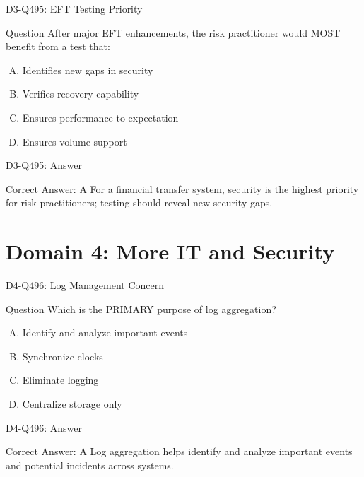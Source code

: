\documentclass{beamer}
\begin{document}
\begin{frame}{D3-Q495: EFT Testing Priority}
	\begin{block}{Question}
		After major EFT enhancements, the risk practitioner would MOST benefit from a test that:
	\end{block}
	\begin{enumerate}[(A)]
		\item Identifies new gaps in security
		\item Verifies recovery capability
		\item Ensures performance to expectation
		\item Ensures volume support
	\end{enumerate}
\end{frame}
\begin{frame}{D3-Q495: Answer}
	\begin{block}{Correct Answer: A}
		For a financial transfer system, security is the highest priority for risk practitioners; testing should reveal new security gaps.
	\end{block}
\end{frame}

\section{Domain 4: More IT and Security}

\begin{frame}{D4-Q496: Log Management Concern}
	\begin{block}{Question}
		Which is the PRIMARY purpose of log aggregation?
	\end{block}
	\begin{enumerate}[(A)]
		\item Identify and analyze important events
		\item Synchronize clocks
		\item Eliminate logging
		\item Centralize storage only
	\end{enumerate}
\end{frame}
\begin{frame}{D4-Q496: Answer}
	\begin{block}{Correct Answer: A}
		Log aggregation helps identify and analyze important events and potential incidents across systems.
	\end{block}
\end{frame}
\end{document}
